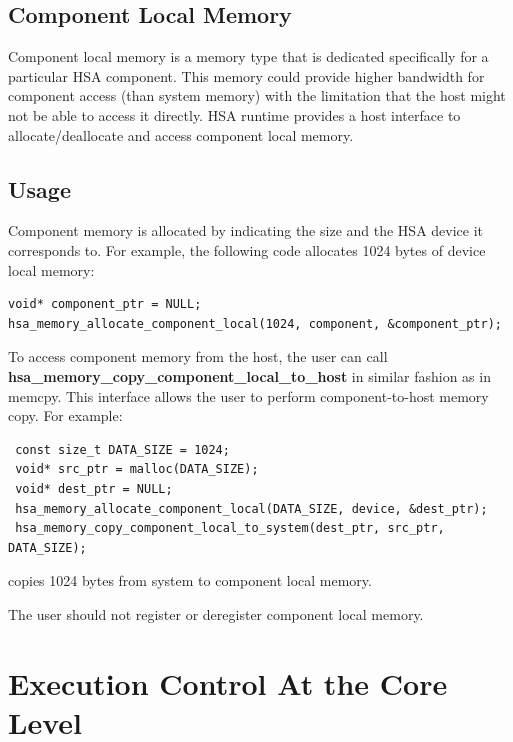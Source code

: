 \documentclass{book}
\newcommand{\reffun}[1]{\textbf{#1}}
\begin{document}


\hypertarget{coreapi_device_memory}{}\subsection{Component Local
  Memory}\label{coreapi_device_memory}

Component local memory is a memory type that is dedicated specifically
for a particular HSA component. This memory could provide higher
bandwidth for component access (than system memory) with the
limitation that the host might not be able to access it directly. HSA
runtime provides a host interface to allocate/deallocate and access
component local memory.



\hypertarget{coreapi_device_memory_usage}{}\subsection{Usage}\label{coreapi_device_memory_usage}

Component memory is allocated by indicating the size and the HSA
device it corresponds to. For example, the following code allocates
1024 bytes of device local memory:

\begin{lstlisting}
void* component_ptr = NULL;
hsa_memory_allocate_component_local(1024, component, &component_ptr);
\end{lstlisting}

To access component memory from the host, the user can call
\reffun{hsa\_memory\_copy\_component\_local\_to\_host} in similar
fashion as in memcpy. This interface allows the user to
perform component-\/to-\/host memory copy. For example:

\begin{lstlisting}
 const size_t DATA_SIZE = 1024;
 void* src_ptr = malloc(DATA_SIZE);
 void* dest_ptr = NULL;
 hsa_memory_allocate_component_local(DATA_SIZE, device, &dest_ptr);
 hsa_memory_copy_component_local_to_system(dest_ptr, src_ptr, DATA_SIZE);
\end{lstlisting}

copies 1024 bytes from system to component local memory.

The user should not register or deregister component local memory.


\hypertarget{coreapi_coredebug}{}\section{Execution Control
  At the Core Level}\label{coreapi_coredebug}
\end{document}
